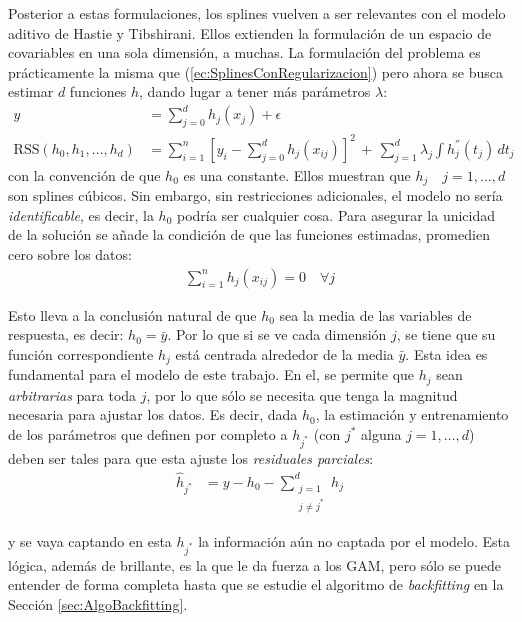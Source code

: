 \documentclass[../../Main/Main.tex]{subfiles}
\begin{document}
Posterior a estas formulaciones, los splines vuelven a ser relevantes con el modelo aditivo de Hastie y Tibshirani. Ellos extienden la formulación de un espacio de covariables en una sola dimensión, a muchas. La formulación del problema es prácticamente la misma que  (\ref{ec:SplinesConRegularizacion}) pero ahora se busca estimar $d$ funciones $h$, dando lugar a tener más parámetros $\lambda$:
\begin{align*}
	y &= \sum_{j = 0}^d h_j(x_j) + \epsilon \\	
	\text{RSS}(h_0, h_1, \ldots, h_d) &= \sum_{i = 1}^n[y_i - \sum_{j = 0}^d h_j(x_{ij})]^2 \, + \, \sum_{j = 1}^d\lambda_j 			\int h_j^{''}(t_j) \, dt_j
\end{align*}
con la convención de que $h_0$ es una constante. Ellos muestran que $h_j \quad j = 1,\ldots,d$ son splines cúbicos. Sin embargo, sin restricciones adicionales, el modelo no sería \textit{identificable}, es decir, la $h_0$ podría ser cualquier cosa. Para asegurar la unicidad de la solución se añade la condición de que las funciones estimadas, promedien cero sobre los datos:
\begin{align}
	\sum_{i = 1}^n h_j(x_{ij}) = 0 \quad \forall j \label{ec:RestriccionGAM}
\end{align}

Esto lleva a la conclusión natural de que $h_0$ sea la media de las variables de respuesta, es decir: $h_0 = \bar{y}$. Por lo que si se ve cada dimensión $j$, se tiene que su función correspondiente $h_j$ está centrada alrededor de la media $\bar{y}$. Esta idea es fundamental para el modelo de este trabajo. En el, se permite que $h_j$ sean \textit{arbitrarias} para toda $j$, por lo que sólo se necesita que tenga la magnitud necesaria para ajustar los datos. Es decir, dada $h_0$, la estimación y entrenamiento de los parámetros que definen por completo a $h_{j^*}$ (con $j^*$ alguna $j=1,\ldots,d$) deben ser tales para que esta ajuste los \textit{residuales parciales}:
\begin{align}
\hat{h}_{j^*} &= y - h_0 - \sum_{\substack{j=1\\ j \neq j^*}}^d h_j \label{ec:ResParciales}
\end{align}

y se vaya captando en esta $h_{j^*}$ la información aún no captada por el modelo. Esta lógica, además de brillante, es la que le da fuerza a los GAM, pero sólo se puede entender de forma completa hasta que se estudie el algoritmo de \textit{backfitting} en la Sección \ref{sec:AlgoBackfitting}. 
\end{document}
